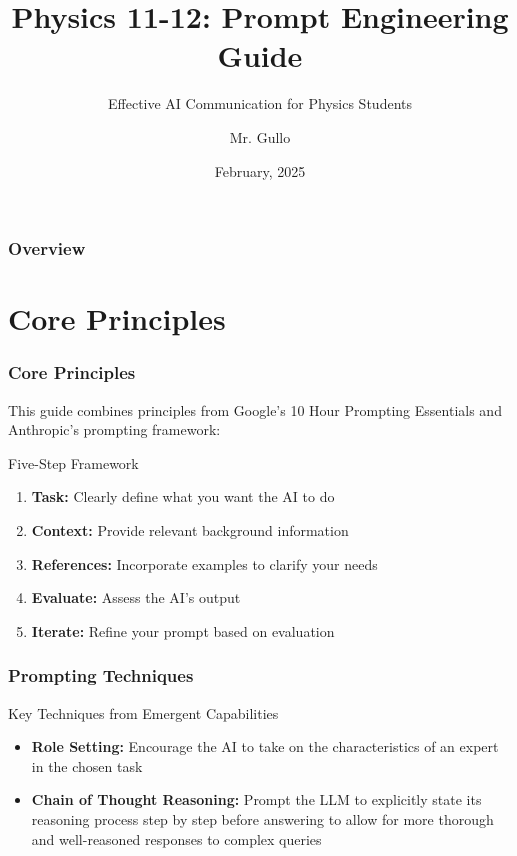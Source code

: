 \documentclass{beamer}
\title[Prompt Engineering]{Physics 11-12: Prompt Engineering Guide}
\subtitle{Effective AI Communication for Physics Students}
\author[Mr. Gullo]{Mr. Gullo}
\date[Feb 2025]{February, 2025}
\institute[Physics Dept.]{Department of Physics}
\begin{document}
\frame{\titlepage}

\begin{frame}
\frametitle{Overview}
\tableofcontents
\end{frame}

\section{Core Principles}
\frame{\sectionpage}
\begin{frame}
\frametitle{Core Principles}
This guide combines principles from Google's 10 Hour Prompting Essentials and Anthropic's prompting framework:

\begin{block}{Five-Step Framework}
\begin{enumerate}
\item \textbf{Task:} Clearly define what you want the AI to do
\item \textbf{Context:} Provide relevant background information
\item \textbf{References:} Incorporate examples to clarify your needs
\item \textbf{Evaluate:} Assess the AI's output
\item \textbf{Iterate:} Refine your prompt based on evaluation
\end{enumerate}
\end{block}
\end{frame}

\begin{frame}
\frametitle{Prompting Techniques}
\begin{block}{Key Techniques from Emergent Capabilities}
\begin{itemize}
\item \textbf{Role Setting:} Encourage the AI to take on the characteristics of an expert in the chosen task
\item \textbf{Chain of Thought Reasoning:} Prompt the LLM to explicitly state its reasoning process step by step before answering to allow for more thorough and well-reasoned responses to complex queries
\end{itemize}
\end{block}
\end{frame}
\end{document}
